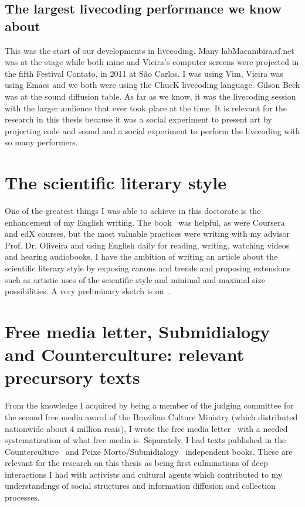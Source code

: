 \begin{apendicesenv}
\subsection{The largest livecoding performance we know about}
This was the start of our developments in livecoding.
Many labMacambira.sf.net was at the stage while both mine and Vieira's computer screens
were projected in the fifth Festival Contato, in 2011 at São Carlos.
I was using Vim, Vieira was using Emacs and we both were using the ChucK
livecoding language.
Gilson Beck was at the sound diffusion table.
As far as we know, it was the livecoding session with the larger audience
that ever took place at the time.
It is relevant for the research in this thesis because it was
a social experiment to present art by projecting code and sound
and a social experiment to perform the livecoding with so many performers.

\section{The scientific literary style}
One of the greatest things I was able to achieve in this doctorate
is the enhancement of my English writing.
The book~\cite{chuLivro} was helpful, as were Coursera and edX courses,
but the most valuable practices were writing with my advisor Prof. Dr. Oliveira
and using English daily for reading, writing, watching videos and hearing audiobooks.
I have the ambition of writing an article about the scientific literary style
by exposing canons and trends and proposing extensions such as artistic uses
of the scientific style and minimal and maximal size possibilities.
A very preliminary sketch is on~\cite{sciStyle}.

\section{Free media letter, Submidialogy and Counterculture: relevant precursory texts}
From the knowledge I acquired by being a member of the judging committee for the second
free media award of the Brazilian Culture Ministry (which distributed nationwide about 4 million reais),
I wrote the free media letter~\cite{cartaML} with a needed systematization of what free media is.
Separately, I had texts published in the Counterculture~\cite{ccd} and Peixe Morto/Submidialogy~\cite{subMid} independent books.
These are relevant for the research on this thesis as being first culminations of deep interactions
I had with activists and cultural agents which contributed to my understandings of social structures
and information diffusion and collection processes.


\end{apendicesenv}
